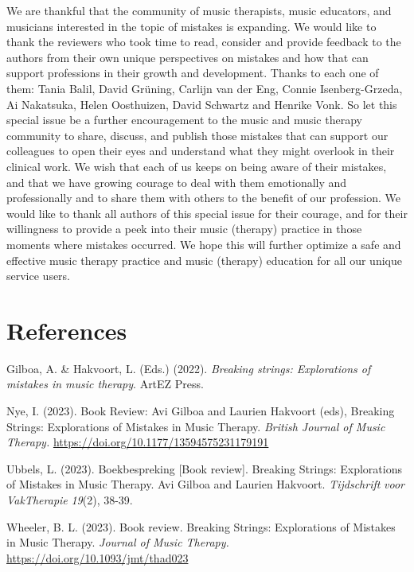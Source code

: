\documentclass[authordate, empirical, issue]{jote-new-article}
\begin{document}
We are thankful that the community of music therapists, music educators, and musicians interested in the topic of mistakes is expanding. We would like to thank the reviewers who took time to read, consider and provide feedback to the authors from their own unique perspectives on mistakes and how that can support professions in their growth and development. Thanks to each one of them: Tania Balil, David Grüning, Carlijn van der Eng, Connie Isenberg-Grzeda, Ai Nakatsuka, Helen Oosthuizen, David Schwartz and Henrike Vonk. So let this special issue be a further encouragement to the music and music therapy community to share, discuss, and publish those mistakes that can support our colleagues to open their eyes and understand what they might overlook in their clinical work. We wish that each of us keeps on being aware of their mistakes, and that we have growing courage to deal with them emotionally and professionally and to share them with others to the benefit of our profession. We would like to thank all authors of this special issue for their courage, and for their willingness to provide a peek into their music (therapy) practice in those moments where mistakes occurred. We hope this will further optimize a safe and effective music therapy practice and music (therapy) education for all our unique service users.
\section{References}

Gilboa, A. \& Hakvoort, L. (Eds.) (2022). \emph{Breaking strings: Explorations of mistakes in music therapy}. ArtEZ Press.

\hspace*{\parindent}Nye, I. (2023). Book Review: Avi Gilboa and Laurien Hakvoort (eds), Breaking Strings: Explorations of Mistakes in Music Therapy. \emph{British Journal of Music Therapy. }\url{https://doi.org/10.1177/13594575231179191}



Ubbels, L. (2023). Boekbespreking [Book review]. Breaking Strings: Explorations of Mistakes in Music Therapy. Avi Gilboa and Laurien Hakvoort. \emph{Tijdschrift}\emph{ }\emph{voor}\emph{ }\emph{VakTherapie}\emph{ 19}(2), 38-39.



Wheeler, B. L. (2023). Book review. Breaking Strings: Explorations of Mistakes in Music Therapy. \emph{Journal of Music Therapy. }\url{https://doi.org/10.1093/jmt/thad023}
\end{document}
